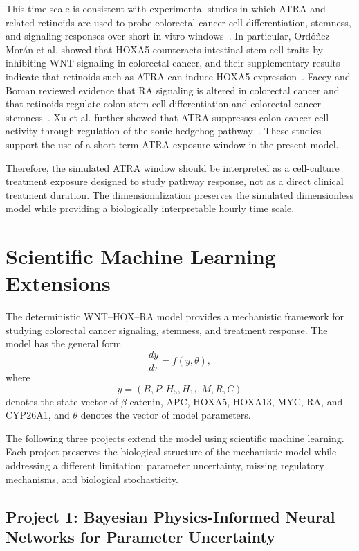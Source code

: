 \documentclass[11pt]{article}
\begin{document}
This time scale is consistent with experimental studies in which ATRA and related
retinoids are used to probe colorectal cancer cell differentiation, stemness, and
signaling responses over short in vitro windows~\cite{ordonezmoran2015hoxa5,facey2020retinoids,xu2022atra}.
In particular, Ordóñez-Morán et al. showed that HOXA5 counteracts intestinal
stem-cell traits by inhibiting WNT signaling in colorectal cancer, and their
supplementary results indicate that retinoids such as ATRA can induce HOXA5
expression~\cite{ordonezmoran2015hoxa5}. Facey and Boman reviewed evidence that RA
signaling is altered in colorectal cancer and that retinoids regulate colon stem-cell
differentiation and colorectal cancer stemness~\cite{facey2020retinoids}. Xu et al.
further showed that ATRA suppresses colon cancer cell activity through regulation
of the sonic hedgehog pathway~\cite{xu2022atra}. These studies support the use of
a short-term ATRA exposure window in the present model.

Therefore, the simulated ATRA window should be interpreted as a cell-culture
treatment exposure designed to study pathway response, not as a direct clinical
treatment duration. The dimensionalization preserves the simulated dimensionless
model while providing a biologically interpretable hourly time scale.


\newpage
\section{Scientific Machine Learning Extensions}

The deterministic WNT--HOX--RA model provides a mechanistic framework for
studying colorectal cancer signaling, stemness, and treatment response. The model
has the general form
\[
\frac{dy}{d\tau}=f(y,\theta),
\]
where
\[
y=(B,P,H_5,H_{13},M,R,C)
\]
denotes the state vector of $\beta$-catenin, APC, HOXA5, HOXA13, MYC, RA, and
CYP26A1, and $\theta$ denotes the vector of model parameters.

The following three projects extend the model using scientific machine learning.
Each project preserves the biological structure of the mechanistic model while
addressing a different limitation: parameter uncertainty, missing regulatory
mechanisms, and biological stochasticity.

\subsection{Project 1: Bayesian Physics-Informed Neural Networks for Parameter Uncertainty}
\end{document}
